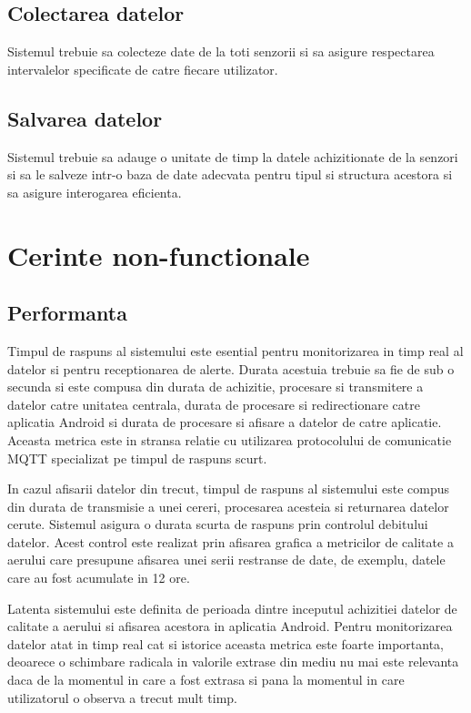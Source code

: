 \subsection{Colectarea datelor}\label{subsec:cnf_colectare}
Sistemul trebuie sa colecteze date de la toti senzorii si sa asigure respectarea intervalelor specificate de catre fiecare utilizator.

\subsection{Salvarea datelor}\label{subsec:cnf_salvare}
Sistemul trebuie sa adauge o unitate de timp la datele achizitionate de la senzori si sa le salveze intr-o baza de date adecvata pentru tipul si 
structura acestora si sa asigure interogarea eficienta.

\section{Cerinte non-functionale}\label{sec:cerinte_nonfunctionale}
\subsection{Performanta}\label{subsec:cnf_performanta}
Timpul de raspuns al sistemului este esential pentru monitorizarea in timp real al datelor si pentru receptionarea de alerte. Durata acestuia trebuie 
sa fie de sub o secunda si este compusa din durata de achizitie, procesare si transmitere a datelor catre unitatea centrala, durata de procesare si 
redirectionare catre aplicatia Android si durata de procesare si afisare a datelor de catre aplicatie. Aceasta metrica este in stransa relatie cu 
utilizarea protocolului de comunicatie MQTT specializat pe timpul de raspuns scurt. 

In cazul afisarii datelor din trecut, timpul de raspuns al sistemului este compus din durata de transmisie a unei cereri, procesarea acesteia si returnarea
datelor cerute. Sistemul asigura o durata scurta de raspuns prin controlul debitului datelor. Acest control este realizat prin afisarea grafica a metricilor
de calitate a aerului care presupune afisarea unei serii restranse de date, de exemplu, datele care au fost acumulate in 12 ore.

Latenta sistemului este definita de perioada dintre inceputul achizitiei datelor de calitate a aerului si afisarea acestora in aplicatia Android. Pentru 
monitorizarea datelor atat in timp real cat si istorice aceasta metrica este foarte importanta, deoarece o schimbare radicala in valorile extrase din mediu 
nu mai este relevanta daca de la momentul in care a fost extrasa si pana la momentul in care utilizatorul o observa a trecut mult timp.

